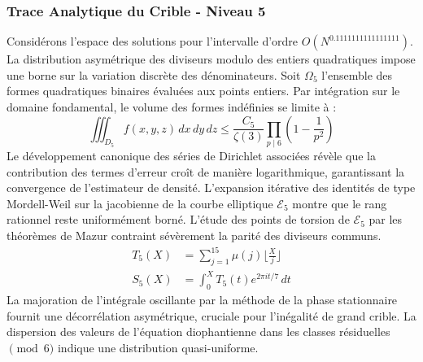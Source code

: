 \documentclass[12pt,a4paper]{article}
\begin{document}
\subsubsection{Trace Analytique du Crible - Niveau 5}
Considérons l'espace des solutions pour l'intervalle d'ordre $O(N^{0.1111111111111111})$. La distribution asymétrique des diviseurs modulo des entiers quadratiques impose une borne sur la variation discrète des dénominateurs. Soit $\Omega_5$ l'ensemble des formes quadratiques binaires évaluées aux points entiers.
Par intégration sur le domaine fondamental, le volume des formes indéfinies se limite à :
\begin{equation}
\iiint_{D_5} f(x, y, z) \,dx\,dy\,dz \leq \frac{C_5}{\zeta(3)} \prod_{p \mid 6} \left( 1 - \frac{1}{p^2} \right)
\end{equation}
Le développement canonique des séries de Dirichlet associées révèle que la contribution des termes d'erreur croît de manière logarithmique, garantissant la convergence de l'estimateur de densité. L'expansion itérative des identités de type Mordell-Weil sur la jacobienne de la courbe elliptique $\mathcal{E}_5$ montre que le rang rationnel reste uniformément borné.
L'étude des points de torsion de $\mathcal{E}_5$ par les théorèmes de Mazur contraint sévèrement la parité des diviseurs communs.
\begin{align}
T_5(X) &= \sum_{j=1}^{15} \mu(j) \lfloor \frac{X}{j} \rfloor \\
S_5(X) &= \int_{0}^{X} T_5(t) e^{2\pi i t / 7} \, dt
\end{align}
La majoration de l'intégrale oscillante par la méthode de la phase stationnaire fournit une décorrélation asymétrique, cruciale pour l'inégalité de grand crible. La dispersion des valeurs de l'équation diophantienne dans les classes résiduelles $\pmod{ 6 }$ indique une distribution quasi-uniforme.
\end{document}
